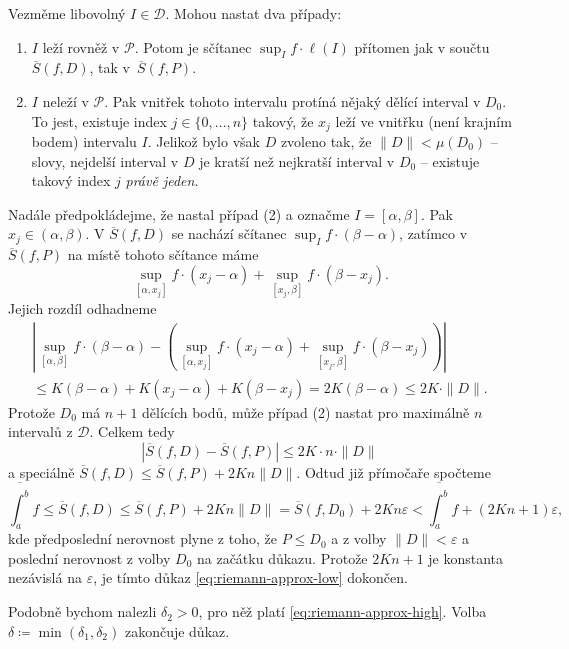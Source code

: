 \begin{thmproof}
 Vezměme libovolný $I \in \mathcal{D}$. Mohou nastat dva případy:
 \begin{enumerate}
  \item $I$ leží rovněž v $\mathcal{P}$. Potom je sčítanec $\sup_I f \cdot
   \ell(I)$ přítomen jak v součtu $\overline{S}(f,D)$, tak
   v~$\overline{S}(f,P)$.
  \item $I$ neleží v $\mathcal{P}$. Pak vnitřek tohoto intervalu protíná nějaký
   dělící interval v $D_0$. To jest, existuje index $j \in \{0,\ldots,n\}$
   takový, že $x_j$ leží ve vnitřku (není krajním bodem) intervalu $I$. Jelikož
   bylo však $D$ zvoleno tak, že $\|D\| < \mu(D_0)$ -- slovy, nejdelší interval
   v $D$ je kratší než nejkratší interval v $D_0$ -- existuje takový index $j$
   \emph{právě jeden}.
 \end{enumerate}
 Nadále předpokládejme, že nastal případ (2) a označme $I = [\alpha,\beta]$. Pak
 $x_j \in (\alpha,\beta)$. V $\overline{S}(f,D)$ se nachází sčítanec $\sup_I f
 \cdot (\beta - \alpha)$, zatímco v $\overline{S}(f,P)$ na místě tohoto sčítance
 máme
 \[
  \sup_{[\alpha,x_j]} f \cdot (x_j - \alpha) + \sup_{[x_j,\beta]} f \cdot
  (\beta - x_j).
 \]
 Jejich rozdíl odhadneme
 \begin{align*}
  |\sup_{[\alpha,\beta]} f \cdot (\beta - \alpha) - (\sup_{[\alpha,x_j]} f \cdot
  (x_j - \alpha) + \sup_{[x_j,\beta]} f \cdot (\beta - x_j))| \\
  \leq K(\beta-\alpha) + K(x_j - \alpha) + K(\beta - x_j) = 2K(\beta-\alpha)
  \leq 2K \cdot \|D\|.
 \end{align*}
 Protože $D_0$ má $n+1$ dělících bodů, může případ (2) nastat pro maximálně $n$
 intervalů z $\mathcal{D}$. Celkem tedy
 \[
  |\overline{S}(f,D) - \overline{S}(f,P)| \leq 2K \cdot n \cdot \|D\|
 \]
 a speciálně $\overline{S}(f,D) \leq \overline{S}(f,P) + 2Kn \|D\|$. Odtud již
 přímočaře spočteme
 \[
  \overline{\int_{a}^{b}} f \leq \overline{S}(f,D) \leq \overline{S}(f,P) + 2Kn
  \|D\| = \overline{S}(f,D_0) + 2Kn\varepsilon < \overline{\int_{a}^{b}} f +
  (2Kn + 1)\varepsilon,
 \]
 kde předposlední nerovnost plyne z toho, že $P \leq D_0$ a z volby $\|D\| <
 \varepsilon$ a poslední nerovnost z volby $D_0$ na začátku důkazu. Protože $2Kn
 + 1$ je konstanta nezávislá na $\varepsilon$, je tímto důkaz
 \eqref{eq:riemann-approx-low} dokončen.

 Podobně bychom nalezli $\delta_2>0$, pro něž platí
 \eqref{eq:riemann-approx-high}. Volba $\delta \coloneqq
 \min(\delta_1,\delta_2)$ zakončuje důkaz.
\end{thmproof}

